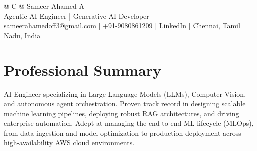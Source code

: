 \documentclass[a4paper,10pt]{article}
\begin{document}
\pagestyle{empty} 

\begin{tabularx}{\linewidth}{@{} C @{}}
\color[HTML]{1C033C} \Huge{Sameer Ahamed A} \\[6pt]
Agentic AI Engineer | Generative AI Developer \\

\href{mailto:sameerahamedoff3@gmail.com}{\textcolor[HTML]{371e77}{{\faEnvelope} sameerahamedoff3@gmail.com }} $|$
\href{tel:+919080861209}{\textcolor[HTML]{371e77}{{\faMobile} +91-9080861209 }} $|$
\href{https://www.linkedin.com/in/sameer-ahamed-338558310/}{\textcolor[HTML]{371e77}{{{\raisebox{-0.05\height}{\faLinkedin} LinkedIn }}}} $|$
\textcolor[HTML]{371e77}{Chennai, Tamil Nadu, India}
\end{tabularx}

\section{Professional Summary}
AI Engineer specializing in Large Language Models (LLMs), Computer Vision, and autonomous agent orchestration. Proven track record in designing scalable machine learning pipelines, deploying robust RAG architectures, and driving enterprise automation. Adept at managing the end-to-end ML lifecycle (MLOps), from data ingestion and model optimization to production deployment across high-availability AWS cloud environments.
\end{document}
